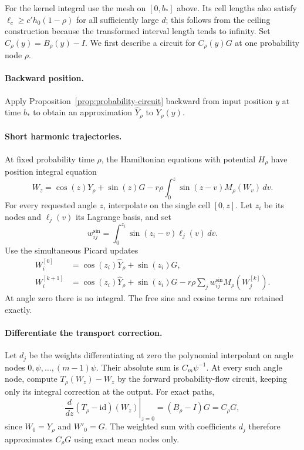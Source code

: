 For the kernel integral use the mesh on $[0,b_*]$ above.  Its cell lengths
also satisfy $\ell_c\ge c'h_0(1-\rho)$ for all sufficiently large $d$;
this follows from the ceiling construction because the transformed
interval length tends to infinity.  Set
$C_\rho(y)=B_\rho(y)-I$.  We first describe a circuit for
$C_\rho(y)G$ at one probability node $\rho$.

\paragraph{Backward position.}
Apply Proposition~\ref{prop:probability-circuit} backward from input
position $y$ at time $b_*$ to obtain an approximation $\widehat Y_\rho$
to $Y_\rho(y)$.

\paragraph{Short harmonic trajectories.}
At fixed probability time $\rho$, the Hamiltonian equations with
potential $H_\rho$ have position integral equation
\begin{equation}\label{eq:harmonic-integral}
 W_z=\cos(z)Y_\rho+\sin(z)G
      -r\rho\int_0^z\sin(z-v)M_\rho(W_v)\,dv.
\end{equation}
For every requested angle $z$, interpolate on the single cell $[0,z]$.
Let $z_i$ be its nodes and $\ell_j(v)$ its Lagrange basis, and set
\[
 w_{ij}^{\sin}=\int_0^{z_i}\sin(z_i-v)\ell_j(v)\,dv.
\]
Use the simultaneous Picard updates
\begin{equation}\label{eq:harmonic-picard}
 \begin{split}
 W_i^{[0]}&=\cos(z_i)\widehat Y_\rho+\sin(z_i)G,\\
 W_i^{[k+1]}&=\cos(z_i)\widehat Y_\rho+\sin(z_i)G
      -r\rho\sum_jw_{ij}^{\sin}M_\rho(W_j^{[k]}).
 \end{split}
\end{equation}
At angle zero there is no integral.  The free sine and cosine terms
are retained exactly.

\paragraph{Differentiate the transport correction.}
Let $d_j$ be the weights differentiating at zero the polynomial
interpolant on angle nodes $0,\psi,\ldots,(m-1)\psi$.  Their absolute
sum is $C_m\psi^{-1}$.  At every such angle node, compute
$T_\rho(W_z)-W_z$ by the forward probability-flow circuit, keeping only
its integral correction at the output.  For exact paths,
\begin{equation}\label{eq:kernel-action-derivative}
 \left.\frac{d}{dz}(T_\rho-\mathrm{id})(W_z)\right|_{z=0}
       =(B_\rho-I)G=C_\rho G,
\end{equation}
since $W_0=Y_\rho$ and $W'_0=G$.  The weighted sum with coefficients
$d_j$ therefore approximates $C_\rho G$ using exact mean nodes only.

